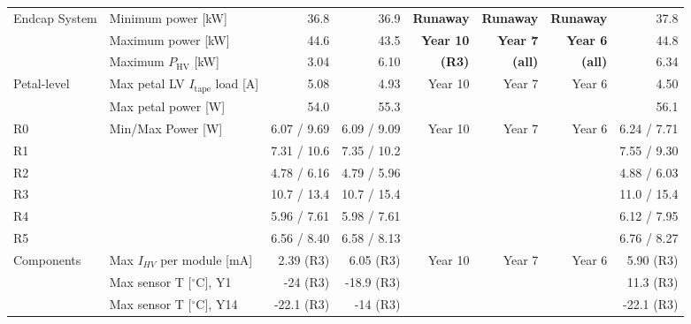 \begin{table}[ht]
\begin{subtable}[t]{.99\linewidth}
\begin{centering}
{\begin{tabular}{|l|l|r|r|r|r|r|r|}
\multirow{3}{*}{Endcap System}  & Minimum power [kW]                           &          36.8 &         36.9 &\bf Runaway&\bf Runaway&\bf Runaway& 37.8 \\ 
                                & Maximum power [kW]                           &          44.6 &         43.5 &\bf Year 10&\bf Year  7&\bf Year  6& 44.8 \\ 
                                & Maximum $P_\text{HV}$ [kW]                   &          3.04 &         6.10 &\bf (R3)   &\bf (all)  &\bf (all)  & 6.34 \\ \hline
\multirow{2}{*}{Petal-level}    & Max petal LV $I_\text{tape}$ load [A]        &          5.08 &         4.93 &\multirow{2}{*}{Year 10}&\multirow{2}{*}{Year  7}&\multirow{2}{*}{Year  6}&   4.50 \\ 
                                & Max petal power [W]                          &          54.0 &         55.3 &  & &  &          56.1 \\ \hline
R0                              & \multirow{6}{*}{Min/Max Power [W]}           &   6.07 / 9.69 &  6.09 / 9.09 &\multirow{6}{*}{Year 10}&\multirow{6}{*}{Year  7}&\multirow{6}{*}{Year  6}& 6.24 / 7.71 \\ 
R1                              &                                              &   7.31 / 10.6 &  7.35 / 10.2 &  & &  &   7.55 / 9.30 \\ 
R2                              &                                              &   4.78 / 6.16 &  4.79 / 5.96 &  & &  &   4.88 / 6.03 \\ 
R3                              &                                              &   10.7 / 13.4 &  10.7 / 15.4 &  & &  &   11.0 / 15.4 \\ 
R4                              &                                              &   5.96 / 7.61 &  5.98 / 7.61 &  & &  &   6.12 / 7.95 \\ 
R5                              &                                              &   6.56 / 8.40 &  6.58 / 8.13 &  & &  &   6.76 / 8.27 \\ \hline
\multirow{5}{*}{Components}     & Max $I_{HV}$ per module [mA]                 &     2.39 (R3) &    6.05 (R3) &\multirow{5}{*}{Year 10}&\multirow{5}{*}{Year  7}&\multirow{5}{*}{Year  6}&     5.90 (R3) \\ 
                                & Max sensor T [$^\circ$C], Y1                 &      -24 (R3) &   -18.9 (R3) &  & &  &     11.3 (R3) \\ 
                                & Max sensor T [$^\circ$C], Y14                &    -22.1 (R3) &     -14 (R3) &  & &  &    -22.1 (R3) \\ 

\end{tabular}}
\end{centering}
\end{subtable}
\end{table}
